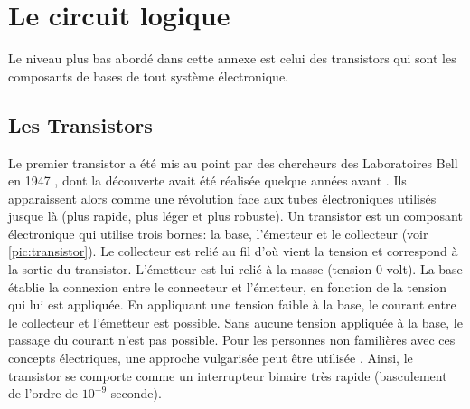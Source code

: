 \section{Le circuit logique} \label{sec:logique}
Le niveau plus bas abordé dans cette annexe est celui des transistors qui sont les composants de bases de tout système électronique. 

\subsection{Les Transistors}
    Le premier transistor a été mis au point par des chercheurs des Laboratoires Bell en 1947 \cite{bardeen1948transistor}, dont la découverte avait été réalisée quelque années avant \cite{edgar1930method}. Ils apparaissent alors comme une révolution face aux tubes électroniques utilisés jusque là (plus rapide, plus léger et plus robuste). Un transistor est un composant électronique qui utilise trois bornes: la base, l’émetteur et le collecteur (voir \autoref{pic:transistor}). Le collecteur est relié au fil d’où vient la tension et correspond à la sortie du transistor. L’émetteur est lui relié à la masse (tension 0 volt). La base établie la connexion entre le connecteur et l'émetteur, en fonction de la tension qui lui est appliquée. En appliquant une tension faible à la base, le courant entre le collecteur et l’émetteur est possible. Sans aucune tension appliquée à la base, le passage du courant n’est pas possible. Pour les personnes non familières avec ces concepts électriques, une approche vulgarisée peut être utilisée \cite{JohnLeDuc2017}. Ainsi, le transistor se comporte comme un interrupteur binaire très rapide (basculement de l'ordre de $10^{-9}$ seconde).
    
    
    
